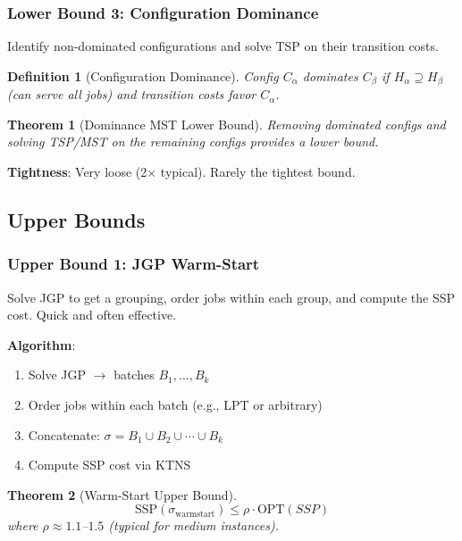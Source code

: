 \documentclass[12pt]{article}
\newtheorem{theorem}{Theorem}[section]
\newtheorem{definition}{Definition}[section]
\begin{document}
	\subsubsection{Lower Bound 3: Configuration Dominance}
	
	Identify non-dominated configurations and solve TSP on their transition costs.
	
	\begin{definition}[Configuration Dominance]
		Config $C_\alpha$ dominates $C_\beta$ if $H_\alpha \supseteq H_\beta$ (can serve all jobs) and transition costs favor $C_\alpha$.
	\end{definition}
	
	\begin{theorem}[Dominance MST Lower Bound]
		\label{thm:dominance_lb}
		Removing dominated configs and solving TSP/MST on the remaining configs provides a lower bound.
	\end{theorem}
	
	\textbf{Tightness}: Very loose (2× typical). Rarely the tightest bound.
	
	\subsection{Upper Bounds}
	
	\subsubsection{Upper Bound 1: JGP Warm-Start}
	
	\begin{intuitionbox}
		Solve JGP to get a grouping, order jobs within each group, and compute the SSP cost. Quick and often effective.
	\end{intuitionbox}
	
	\textbf{Algorithm}:
	\begin{enumerate}
		\item Solve JGP $\to$ batches $B_1, \ldots, B_k$
		\item Order jobs within each batch (e.g., LPT or arbitrary)
		\item Concatenate: $\sigma = B_1 \cup B_2 \cup \cdots \cup B_k$
		\item Compute SSP cost via KTNS
	\end{enumerate}
	
	\begin{theorem}[Warm-Start Upper Bound]
		$$\text{SSP}(\sigma_{\text{warmstart}}) \le \rho \cdot \text{OPT}(SSP)$$
		where $\rho \approx 1.1$--$1.5$ (typical for medium instances).
	\end{theorem}
	
\end{document}
